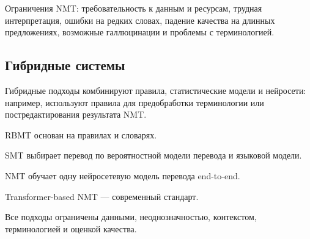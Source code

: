 Ограничения NMT: требовательность к данным и ресурсам, трудная интерпретация, ошибки на редких словах, падение качества на длинных предложениях, возможные галлюцинации и проблемы с терминологией.

\subsection*{Гибридные системы}

Гибридные подходы комбинируют правила, статистические модели и нейросети: например, используют правила для предобработки терминологии или постредактирования результата NMT.

\begin{important}
    \item RBMT основан на правилах и словарях.
    \item SMT выбирает перевод по вероятностной модели перевода и языковой модели.
    \item NMT обучает одну нейросетевую модель перевода end-to-end.
    \item Transformer-based NMT --- современный стандарт.
    \item Все подходы ограничены данными, неоднозначностью, контекстом, терминологией и оценкой качества.
\end{important}
